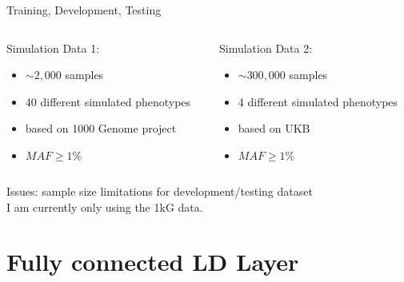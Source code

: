 \documentclass{beamer}
\begin{document}
\begin{frame}[t]{Training, Development, Testing}
  \begin{columns}[t]
    \begin{column}{0.5\textwidth}
      Simulation Data 1:\\
      \begin{itemize}
        \item $\sim2,000$ samples
        \item 40 different simulated phenotypes
        \item based on 1000 Genome project
        \item $MAF\geq1\%$
      \end{itemize}
    \end{column}
    \begin{column}{0.5\textwidth}
     Simulation Data 2: 
     \begin{itemize}
       \item $\sim300,000$ samples
       \item 4 different simulated phenotypes
       \item based on UKB
        \item $MAF\geq1\%$
     \end{itemize}
    \end{column}
  \end{columns}
  Issues: sample size limitations for development/testing dataset \\
  I am currently only using the 1kG data.
\end{frame}

\section{Fully connected LD Layer}
\end{document}
